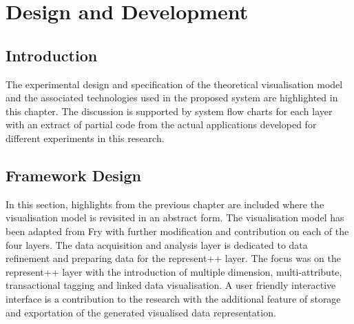
\chapter{Design and Development} %

\label{Chapter4} %


\section{Introduction}

The experimental design and specification of the theoretical visualisation model and the associated technologies used in the proposed system are highlighted in this chapter. The discussion is supported by system flow charts for each layer with an extract of partial code from the actual applications developed for different experiments in this research.

\section{Framework Design}

In this section, highlights from the previous chapter are included where the visualisation model is revisited in an abstract form. The visualisation model has been adapted from Fry \cite{fry} with further modification and contribution on each of the four layers. The data acquisition and analysis layer is dedicated to data refinement and preparing data for the represent++ layer. The focus was on the represent++ layer with the introduction of multiple dimension, multi-attribute, transactional tagging and linked data visualisation. A user friendly interactive interface is a contribution to the research with the additional feature of storage and exportation of the generated visualised data representation.


